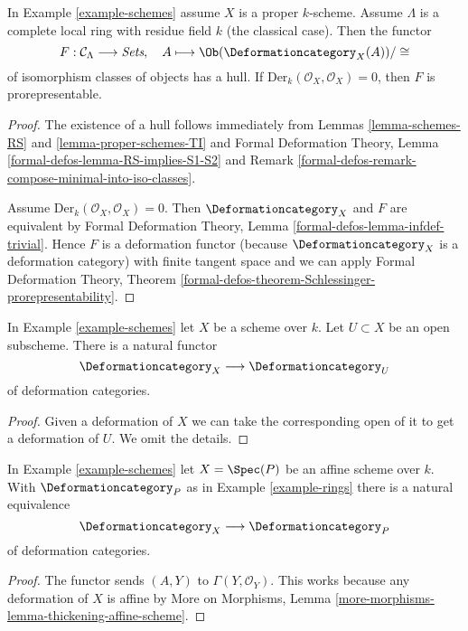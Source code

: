 \begin{lemma}
\label{lemma-schemes-hull}
In Example \ref{example-schemes} assume $X$ is a proper $k$-scheme.
Assume $\Lambda$ is a complete local ring with residue field $k$
(the classical case). Then the functor
$$
F : \mathcal{C}_\Lambda \longrightarrow \textit{Sets},\quad
A \longmapsto \Ob(\Deformationcategory_X(A))/\cong
$$
of isomorphism classes of objects has a hull. If
$\text{Der}_k(\mathcal{O}_X, \mathcal{O}_X) = 0$, then
$F$ is prorepresentable.
\end{lemma}

\begin{proof}
The existence of a hull follows immediately from
Lemmas \ref{lemma-schemes-RS} and \ref{lemma-proper-schemes-TI} and
Formal Deformation Theory, Lemma \ref{formal-defos-lemma-RS-implies-S1-S2}
and Remark \ref{formal-defos-remark-compose-minimal-into-iso-classes}.

\medskip\noindent
Assume $\text{Der}_k(\mathcal{O}_X, \mathcal{O}_X) = 0$. Then
$\Deformationcategory_X$ and $F$ are equivalent by
Formal Deformation Theory, Lemma \ref{formal-defos-lemma-infdef-trivial}.
Hence $F$ is a deformation functor (because $\Deformationcategory_X$ is a
deformation category) with finite tangent space and we can apply
Formal Deformation Theory, Theorem
\ref{formal-defos-theorem-Schlessinger-prorepresentability}.
\end{proof}

\begin{lemma}
\label{lemma-open}
In Example \ref{example-schemes} let $X$ be a scheme over $k$.
Let $U \subset X$ be an open subscheme.
There is a natural functor
$$
\Deformationcategory_X \longrightarrow \Deformationcategory_U
$$
of deformation categories.
\end{lemma}

\begin{proof}
Given a deformation of $X$ we can take the corresponding open
of it to get a deformation of $U$. We omit the details.
\end{proof}

\begin{lemma}
\label{lemma-affine}
In Example \ref{example-schemes} let $X = \Spec(P)$ be an
affine scheme over $k$. With $\Deformationcategory_P$ as in
Example \ref{example-rings} there is a natural equivalence
$$
\Deformationcategory_X \longrightarrow \Deformationcategory_P
$$
of deformation categories.
\end{lemma}

\begin{proof}
The functor sends $(A, Y)$ to $\Gamma(Y, \mathcal{O}_Y)$.
This works because
any deformation of $X$ is affine by
More on Morphisms, Lemma \ref{more-morphisms-lemma-thickening-affine-scheme}.
\end{proof}

